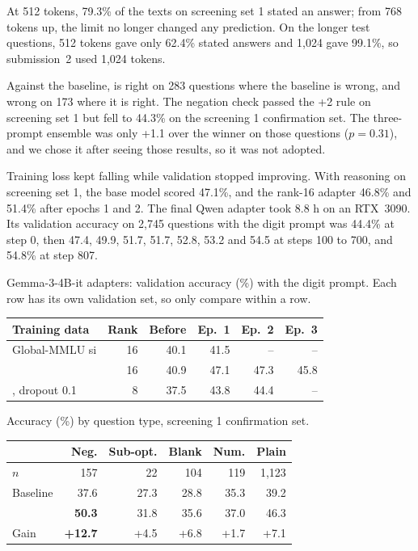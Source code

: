  At 512 tokens, 79.3\% of the texts on screening set 1 stated an answer; from 768 tokens up, the limit no longer changed any prediction. On the longer test questions, 512 tokens gave only 62.4\% stated answers and 1,024 gave 99.1\%, so submission~2 used 1,024 tokens.

 Against the baseline,  is right on 283 questions where the baseline is wrong, and wrong on 173 where it is right. The negation check passed the +2 rule on screening set 1 but fell to 44.3\% on the screening 1 confirmation set. The three-prompt ensemble was only +1.1 over the winner on those questions ($p=0.31$), and we chose it after seeing those results, so it was not adopted.

 Training loss kept falling while validation stopped improving. With reasoning on screening set 1, the base model scored 47.1\%, and the rank-16 \sinmulu{} adapter 46.8\% and 51.4\% after epochs 1 and 2. The final Qwen adapter took 8.8 h on an RTX~3090. Its validation accuracy on 2,745 questions with the digit prompt was 44.4\% at step 0, then 47.4, 49.9, 51.7, 51.7, 52.8, 53.2 and 54.5 at steps 100 to 700, and 54.8\% at step 807.

\begin{center}\captionsetup{type=table}
\small
\caption{Gemma-3-4B-it adapters: validation accuracy (\%) with the digit prompt. Each row has its own validation set, so only compare within a row.}\label{tab:adapters}
\begin{tabularx}{\columnwidth}{@{}Yrrrrr@{}}
\toprule
Training data & Rank & Before & Ep.\ 1 & Ep.\ 2 & Ep.\ 3 \\
\midrule
Global-MMLU si & 16 & 40.1 & 41.5 & -- & -- \\
\sinmulu{} & 16 & 40.9 & 47.1 & 47.3 & 45.8 \\
\sinmulu{}, dropout 0.1 & 8 & 37.5 & 43.8 & 44.4 & -- \\
\bottomrule
\end{tabularx}
\end{center}

\begin{center}\captionsetup{type=table}
\small
\caption{Accuracy (\%) by question type, screening 1 confirmation set.}\label{tab:types}
\begin{tabularx}{\columnwidth}{@{}Yrrrrr@{}}
\toprule
& Neg. & Sub-opt. & Blank & Num. & Plain \\
\midrule
$n$ & 157 & 22 & 104 & 119 & 1,123 \\
Baseline & 37.6 & 27.3 & 28.8 & 35.3 & 39.2 \\
 & \textbf{50.3} & 31.8 & 35.6 & 37.0 & 46.3 \\
Gain & \textbf{+12.7} & +4.5 & +6.8 & +1.7 & +7.1 \\
\bottomrule
\end{tabularx}
\end{center}

